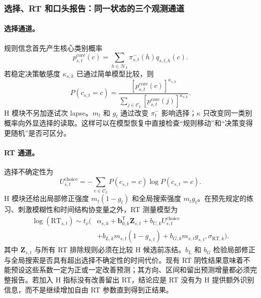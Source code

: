 \subsubsection{选择、RT 和口头报告：同一状态的三个观测通道}

\paragraph{选择通道。}
规则信念首先产生核心类别概率
\begin{equation}
    p^{\mathrm{core}}_{s,t}(c)
    =\sum_{h\in\mathcal H_k}
      \pi^-_{s,t}(h)q_{s,t,h}(c).
    \label{eq:model0803-core-choice}
\end{equation}
若稳定决策敏感度 $\kappa_{s,k}$ 已通过简单模型比较，则
\begin{equation}
    P(c_{s,t}=c)
    =
    \frac{[p^{\mathrm{core}}_{s,t}(c)]^{\kappa_{s,k}}}
    {\sum_{j\in\mathcal C_k}
     [p^{\mathrm{core}}_{s,t}(j)]^{\kappa_{s,k}}}.
    \label{eq:model0803-choice-readout}
\end{equation}
H 模块不另加逐试次 lapse。$m_t$ 和 $g_t$ 通过改变 $\pi^-_t$ 影响选择；$\kappa$ 只改变同一类别概率向外显选择的读取。这样可以在模型恢复中直接检查“规则移动”和“决策变得更随机”是否可区分。

\paragraph{RT 通道。}
选择不确定性为
\begin{equation}
    U^{\mathrm{choice}}_{s,t}
    =-\sum_{c\in\mathcal C_k}
      P(c_{s,t}=c)\log P(c_{s,t}=c).
    \label{eq:model0803-choice-uncertainty}
\end{equation}
H 模块还给出局部修正强度 $m_t(1-g_t)$ 和全局搜索强度 $m_tg_t$。在预先规定的练习、刺激模糊性和时间结构协变量之外，RT 测量模型为
\begin{align}
    \log(\mathrm{RT}_{s,t})
    \sim t_\nu\!\Big(&
      \alpha_{s,k}
      +\mathbf b_{0,k}^{\mathsf T}\mathbf Z_{s,t}
      +b_{U,k}U^{\mathrm{choice}}_{s,t}\nonumber\\
      &+b_{L,k}m_{s,t}(1-g_{s,t})
      +b_{G,k}m_{s,t}g_{s,t},
      \sigma_{\mathrm{RT},k}
    \Big).
    \label{eq:model0803-rt-channel}
\end{align}
其中 $\mathbf Z_{s,t}$ 与所有 RT 排除规则必须在比较 H 候选前冻结。$b_L$ 和 $b_G$ 检验局部修正与全局搜索是否具有超出选择不确定性的时间代价。现有 RT 阴性结果意味着不能预设这些系数一定为正或一定改善预测；其方向、区间和留出预测增量都必须完整报告。若加入 H 指标没有改善留出 RT，结论应是 RT 没有为 H 提供额外识别信息，而不是继续增加自由 RT 参数直到得到正结果。

